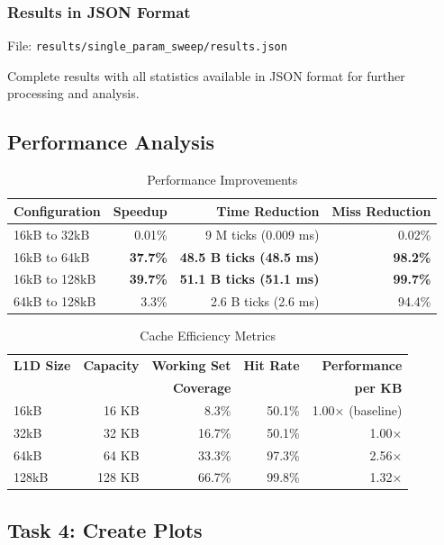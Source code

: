\documentclass[11pt,a4paper]{article}
\begin{document}
\subsubsection{Results in JSON Format}

File: \texttt{results/single\_param\_sweep/results.json}

Complete results with all statistics available in JSON format for further processing and analysis.

\subsection{Performance Analysis}

\begin{table}[H]
\centering
\caption{Performance Improvements}
\begin{tabular}{lrrr}
\toprule
\textbf{Configuration} & \textbf{Speedup} & \textbf{Time Reduction} & \textbf{Miss Reduction} \\
\midrule
16kB to 32kB  & 0.01\%   & 9 M ticks (0.009 ms)    & 0.02\% \\
16kB to 64kB  & \textbf{37.7\%} & \textbf{48.5 B ticks (48.5 ms)} & \textbf{98.2\%} \\
16kB to 128kB & \textbf{39.7\%} & \textbf{51.1 B ticks (51.1 ms)} & \textbf{99.7\%} \\
64kB to 128kB & 3.3\%    & 2.6 B ticks (2.6 ms)     & 94.4\% \\
\bottomrule
\end{tabular}
\end{table}

\begin{table}[H]
\centering
\caption{Cache Efficiency Metrics}
\begin{tabular}{lrrrr}
\toprule
\textbf{L1D Size} & \textbf{Capacity} & \textbf{Working Set} & \textbf{Hit Rate} & \textbf{Performance} \\
 &  & \textbf{Coverage} &  & \textbf{per KB} \\
\midrule
16kB  & 16 KB  & 8.3\%  & 50.1\% & 1.00× (baseline) \\
32kB  & 32 KB  & 16.7\% & 50.1\% & 1.00× \\
64kB  & 64 KB  & 33.3\% & 97.3\% & 2.56× \\
128kB & 128 KB & 66.7\% & 99.8\% & 1.32× \\
\bottomrule
\end{tabular}
\end{table}

\subsection{Task 4: Create Plots}
\end{document}
